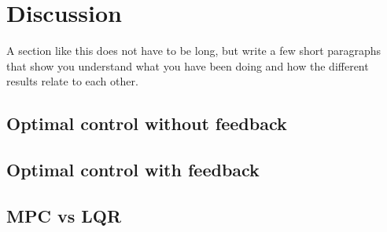 \section{Discussion}\label{sec:discussion}
A section like this does not have to be long, but write a few short paragraphs that show you understand what you have been doing and how the different results relate to each other.

\subsection{Optimal control without feedback}

\subsection{Optimal control with feedback}

\subsection{MPC vs  LQR}